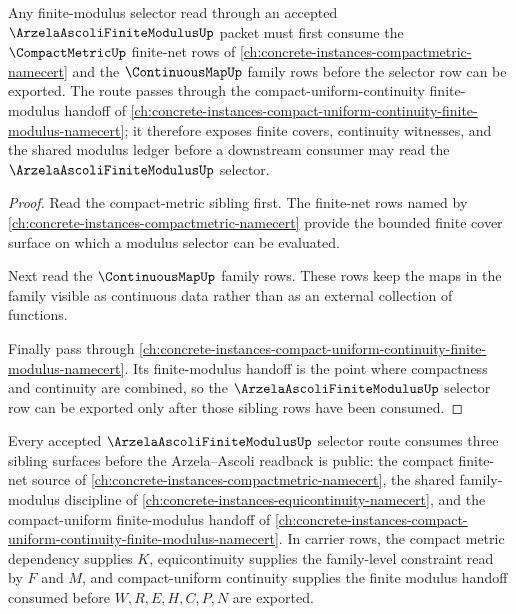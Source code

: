 \begin{theorem}
\label{thm:arzela-ascoli-finite-modulus-compactmetric-sibling-readback}
Any finite-modulus selector read through an accepted $\ArzelaAscoliFiniteModulusUp$ packet must first consume the $\CompactMetricUp$ finite-net rows of \autoref{ch:concrete-instances-compactmetric-namecert} and the $\ContinuousMapUp$ family rows before the selector row can be exported. The route passes through the compact-uniform-continuity finite-modulus handoff of \autoref{ch:concrete-instances-compact-uniform-continuity-finite-modulus-namecert}; it therefore exposes finite covers, continuity witnesses, and the shared modulus ledger before a downstream consumer may read the $\ArzelaAscoliFiniteModulusUp$ selector.
\end{theorem}

\begin{proof}
Read the compact-metric sibling first. The finite-net rows named by \autoref{ch:concrete-instances-compactmetric-namecert} provide the bounded finite cover surface on which a modulus selector can be evaluated.

Next read the $\ContinuousMapUp$ family rows. These rows keep the maps in the family visible as continuous data rather than as an external collection of functions.

Finally pass through \autoref{ch:concrete-instances-compact-uniform-continuity-finite-modulus-namecert}. Its finite-modulus handoff is the point where compactness and continuity are combined, so the $\ArzelaAscoliFiniteModulusUp$ selector row can be exported only after those sibling rows have been consumed.
\end{proof}

\begin{theorem}
\label{thm:arzela-ascoli-finite-modulus-compact-equicontinuity-dependency}
Every accepted $\ArzelaAscoliFiniteModulusUp$ selector route consumes three sibling surfaces before the Arzela--Ascoli readback is public: the compact finite-net source of \autoref{ch:concrete-instances-compactmetric-namecert}, the shared family-modulus discipline of \autoref{ch:concrete-instances-equicontinuity-namecert}, and the compact-uniform finite-modulus handoff of \autoref{ch:concrete-instances-compact-uniform-continuity-finite-modulus-namecert}. In carrier rows, the compact metric dependency supplies $K$, equicontinuity supplies the family-level constraint read by $F$ and $M$, and compact-uniform continuity supplies the finite modulus handoff consumed before $W,R,E,H,C,P,N$ are exported.
\end{theorem}

